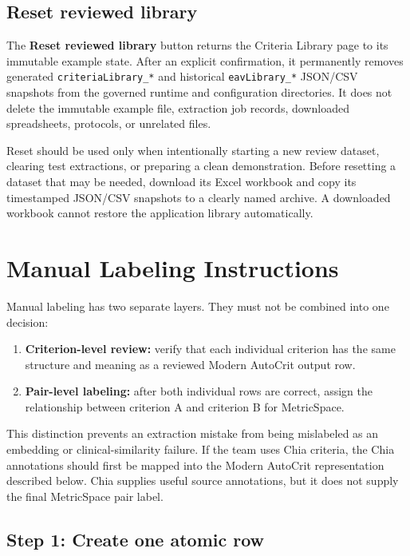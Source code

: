 \documentclass[11pt]{article}
\newcommand{\code}[1]{\texttt{#1}}
\begin{document}
\subsection{Reset reviewed library}

The \textbf{Reset reviewed library} button returns the Criteria Library page to its immutable example state. After an explicit confirmation, it permanently removes generated \code{criteriaLibrary\_*} and historical \code{eavLibrary\_*} JSON/CSV snapshots from the governed runtime and configuration directories. It does not delete the immutable example file, extraction job records, downloaded spreadsheets, protocols, or unrelated files.

Reset should be used only when intentionally starting a new review dataset, clearing test extractions, or preparing a clean demonstration. Before resetting a dataset that may be needed, download its Excel workbook and copy its timestamped JSON/CSV snapshots to a clearly named archive. A downloaded workbook cannot restore the application library automatically.

\section{Manual Labeling Instructions}

Manual labeling has two separate layers. They must not be combined into one decision:

\begin{enumerate}
    \item \textbf{Criterion-level review:} verify that each individual criterion has the same structure and meaning as a reviewed Modern AutoCrit output row.
    \item \textbf{Pair-level labeling:} after both individual rows are correct, assign the relationship between criterion A and criterion B for MetricSpace.
\end{enumerate}

This distinction prevents an extraction mistake from being mislabeled as an embedding or clinical-similarity failure. If the team uses Chia criteria, the Chia annotations should first be mapped into the Modern AutoCrit representation described below. Chia supplies useful source annotations, but it does not supply the final MetricSpace pair label.

\subsection{Step 1: Create one atomic row}
\end{document}

